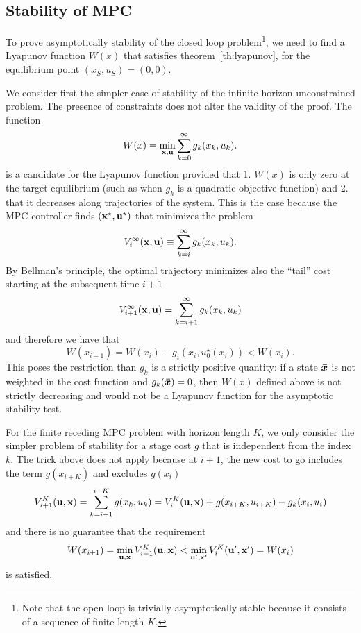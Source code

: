 \subsection{Stability of MPC}
\label{sec:stability-MPC}

To prove asymptotically stability of the closed loop problem\footnote{Note that the open loop is trivially asymptotically stable because it consists of a sequence of finite length $K$.}, we need to find a Lyapunov function $W(x)$ that satisfies theorem~\ref{th:lyapunov}, for the equilibrium point $(x_S,u_S)=(0,0)$.

We consider first the simpler case of stability of the infinite horizon unconstrained problem. The presence of constraints does not alter the validity of the proof. The function
\begin{equation*}
  W(x) = \min_{\boldsymbol{\mathrm{x}},\boldsymbol{\mathrm{u}}} \sum_{k=0}^\infty g_k(x_k,u_k).
\end{equation*}
is a candidate for the Lyapunov function provided that 1. $W(x)$ is only zero at the target equilibrium (such as when $g_k$ is a quadratic objective function) and 2. that it decreases along trajectories of the system. This is the case because the MPC controller finds $(\boldsymbol{\mathrm{x}}^\star, \boldsymbol{\mathrm{u}}^\star)$ that minimizes the problem
\begin{equation*}
  V^\infty_i(\boldsymbol{\mathrm{x}},\boldsymbol{\mathrm{u}}) \equiv \sum_{k=i}^\infty g_k(x_k,u_k).
\end{equation*}
By Bellman's principle, the optimal trajectory minimizes also the ``tail'' cost starting at the subsequent time $i+1$
\begin{equation*}
  V_{i+1}^\infty(\boldsymbol{\mathrm{x}},\boldsymbol{\mathrm{u}}) = \sum_{k=i+1}^\infty g_k(x_k,u_k)
\end{equation*}
and therefore we have that
\begin{equation*}
  W(x_{i+1}) = W(x_i) - g_i(x_i,u_0^\star(x_i)) < W(x_i).
\end{equation*}
This poses the restriction than $g_k$ is a strictly positive quantity: if a state $\boldsymbol{\bar{x}}$ is not weighted in the cost function and $g_k(\boldsymbol{\bar{x}})=0$, then $W(x)$ defined above is not strictly decreasing and would not be a Lyapunov function for the asymptotic stability test.

For the finite receding MPC problem with horizon length $K$, we only consider the simpler problem of stability for a stage cost $g$ that is independent from the index $k$. The trick above does not apply because at $i+1$, the new cost to go includes the term $g(x_{i+K})$ and excludes $g(x_i)$
\begin{equation*}
  V^K_{i+1}(\boldsymbol{\mathrm{u}},\boldsymbol{\mathrm{x}}) = \sum_{k=i+1}^{i+K}g(x_k,u_k) = V_i^K(\boldsymbol{\mathrm{u}},\boldsymbol{\mathrm{x}}) + g(x_{i+K},u_{i+K}) - g_k(x_i,u_i)
\end{equation*}
and there is no guarantee that the requirement
\begin{equation*}
  W(x_{i+1}) = \min_{\boldsymbol{\mathrm{u}},\boldsymbol{\mathrm{x}}} V^K_{i+1}(\boldsymbol{\mathrm{u}},\boldsymbol{\mathrm{x}}) < \min_{\boldsymbol{\mathrm{u}}',\boldsymbol{\mathrm{x}}'} V^K_i(\boldsymbol{\mathrm{u}}',\boldsymbol{\mathrm{x}}') = W(x_i)
\end{equation*}
is satisfied.

